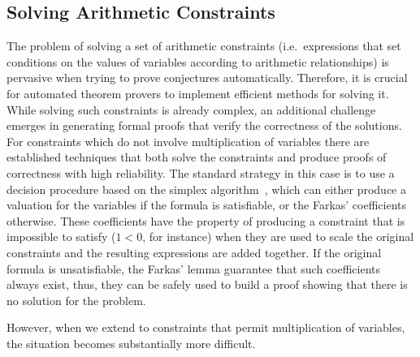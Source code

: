 \documentclass[a4paper, 12pt]{article}
\begin{document}
\subsection{Solving Arithmetic Constraints}

The problem of solving a set of arithmetic constraints (i.e.\ expressions that set conditions on the values
of variables according to arithmetic relationships) is pervasive when trying to prove conjectures automatically. Therefore, it is crucial for automated theorem provers to implement efficient methods
for solving it.
%
While solving such constraints is already complex, an additional challenge emerges in generating
formal proofs that verify the correctness of the solutions.
%
For constraints which do not involve multiplication of variables there are established techniques
that both solve the constraints and produce proofs of correctness with high reliability.
%
The standard strategy in this case is to use a decision procedure based on the simplex algorithm~\cite{simplex_dpllt}, which can either produce a valuation for the variables if the formula
is satisfiable, or the Farkas' coefficients~\cite{farkas_ref} otherwise.
%
These coefficients have the property of producing a constraint that is impossible to satisfy
($1 < 0$, for instance) when they are used to scale the original constraints and the resulting
expressions are added together.
%
If the original formula is unsatisfiable, the Farkas' lemma guarantee that such coefficients always
exist, thus, they can be safely used to build a proof showing that there is no solution for the problem.

However, when we extend to constraints that permit multiplication of variables,
the situation becomes substantially more difficult.



\end{document}
